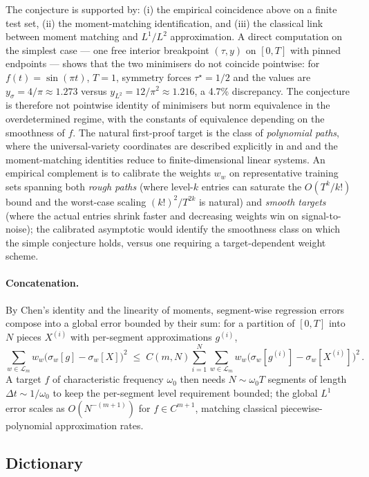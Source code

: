 \documentclass[11pt,english]{article}
\begin{document}
The conjecture is supported by: (i) the empirical coincidence above
on a finite test set, (ii) the moment-matching identification, and
(iii) the classical link between moment matching and $L^{1}/L^{2}$
approximation. A direct computation on the simplest case --- one free
interior breakpoint $(\tau,y)$ on $[0,T]$ with pinned endpoints ---
shows that the two minimisers do not coincide pointwise: for $f(t)=\sin(\pi t)$,
$T=1$, symmetry forces $\tau^{\star}=1/2$ and the values are $y_{\sigma}=4/\pi\approx1.273$
versus $y_{L^{2}}=12/\pi^{2}\approx1.216$, a 4.7\% discrepancy. The
conjecture is therefore not pointwise identity of minimisers but norm
equivalence in the overdetermined regime, with the constants of equivalence
depending on the smoothness of $f$. The natural first-proof target
is the class of \emph{polynomial paths}, where the universal-variety
coordinates are described explicitly in \cite{varieties} and \cite{learning}
and the moment-matching identities reduce to finite-dimensional linear
systems. An empirical complement is to calibrate the weights $w_{w}$
on representative training sets spanning both \emph{rough paths} (where
level-$k$ entries can saturate the $O(T^{k}/k!)$ bound and the worst-case
scaling $(k!)^{2}/T^{2k}$ is natural) and \emph{smooth targets} (where
the actual entries shrink faster and decreasing weights win on signal-to-noise);
the calibrated asymptotic would identify the smoothness class on which
the simple conjecture holds, versus one requiring a target-dependent
weight scheme.

\paragraph{Concatenation.}
By Chen's identity and the linearity of moments, segment-wise regression
errors compose into a global error bounded by their sum: for a partition
of $[0,T]$ into $N$ pieces $X^{(i)}$ with per-segment approximations
$g^{(i)}$,
\[
\sum_{w\in\mathcal{L}_{m}}w_{w}\bigl(\sigma_{w}[g]-\sigma_{w}[X]\bigr)^{2}\;\leq\;C(m,N)\sum_{i=1}^{N}\sum_{w\in\mathcal{L}_{m}}w_{w}\bigl(\sigma_{w}[g^{(i)}]-\sigma_{w}[X^{(i)}]\bigr)^{2}\,.
\]
A target $f$ of characteristic frequency $\omega_{0}$ then needs
$N\sim\omega_{0}T$ segments of length $\Delta t\sim1/\omega_{0}$
to keep the per-segment level requirement bounded; the global $L^{1}$
error scales as $O(N^{-(m+1)})$ for $f\in C^{m+1}$, matching classical
piecewise-polynomial approximation rates.

\subsection{Dictionary}
\end{document}
